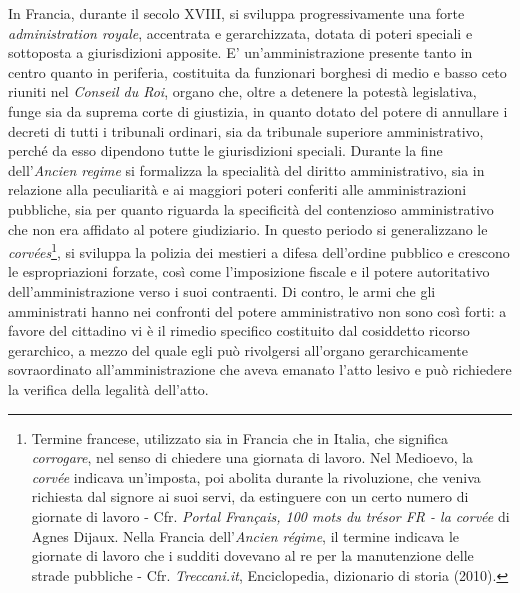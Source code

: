 \documentclass[12pt,it,a4paper,]{report}
\begin{document}
In Francia, durante il secolo XVIII, si sviluppa progressivamente una
forte \emph{administration royale}, accentrata e gerarchizzata, dotata
di poteri speciali e sottoposta a giurisdizioni apposite. E'
un'amministrazione presente tanto in centro quanto in periferia,
costituita da funzionari borghesi di medio e basso ceto riuniti nel
\emph{Conseil du Roi}, organo che, oltre a detenere la potestà
legislativa, funge sia da suprema corte di giustizia, in quanto dotato
del potere di annullare i decreti di tutti i tribunali ordinari, sia da
tribunale superiore amministrativo, perché da esso dipendono tutte le
giurisdizioni speciali. Durante la fine dell'\emph{Ancien regime} si
formalizza la specialità del diritto amministrativo, sia in relazione
alla peculiarità e ai maggiori poteri conferiti alle amministrazioni
pubbliche, sia per quanto riguarda la specificità del contenzioso
amministrativo che non era affidato al potere giudiziario. In questo
periodo si generalizzano le \emph{corvées}\footnote{Termine francese,
  utilizzato sia in Francia che in Italia, che significa
  \emph{corrogare}, nel senso di chiedere una giornata di lavoro. Nel
  Medioevo, la \emph{corvée} indicava un'imposta, poi abolita durante la
  rivoluzione, che veniva richiesta dal signore ai suoi servi, da
  estinguere con un certo numero di giornate di lavoro - Cfr.
  \emph{Portal Français, 100 mots du trésor FR - la corvée} di Agnes
  Dijaux. Nella Francia dell'\emph{Ancien régime}, il termine indicava
  le giornate di lavoro che i sudditi dovevano al re per la manutenzione
  delle strade pubbliche - Cfr. \emph{Treccani.it}, Enciclopedia,
  dizionario di storia (2010).}, si sviluppa la polizia dei mestieri a
difesa dell'ordine pubblico e crescono le espropriazioni forzate, così
come l'imposizione fiscale e il potere autoritativo dell'amministrazione
verso i suoi contraenti. Di contro, le armi che gli amministrati hanno
nei confronti del potere amministrativo non sono così forti: a favore
del cittadino vi è il rimedio specifico costituito dal cosiddetto
ricorso gerarchico, a mezzo del quale egli può rivolgersi all'organo
gerarchicamente sovraordinato all'amministrazione che aveva emanato
l'atto lesivo e può richiedere la verifica della legalità dell'atto.
\end{document}
